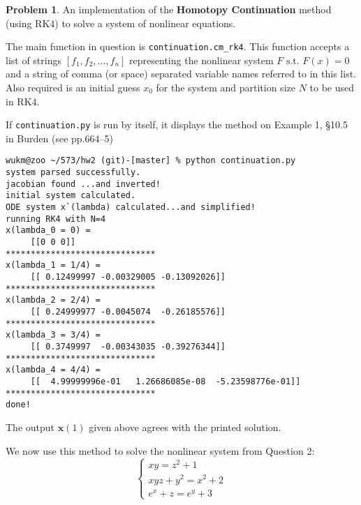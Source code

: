 \documentclass[10pt]{article}
\theoremstyle{plain}
\theoremstyle{definition}
\newtheorem{prob}{Problem}
\numberwithin{equation}{section}
\providecommand{\st}{\text{ s.t. }}
\begin{document}
\begin{prob}
    An implementation of the \textbf{Homotopy Continuation} method (using RK4) to solve a system of
    nonlinear equations.
    
    The main function in question is \texttt{continuation.cm\_rk4}. This function accepts
    a list of strings $[f_1, f_2, \ldots, f_n]$ representing the nonlinear system $F \st F(x)=0$
    and a string of comma (or space) separated variable names referred to in this list. 
    Also required is an initial guess $x_0$ for the system and partition size $N$ to be used in RK4.
    
    If \texttt{continuation.py} is run by itself, it displays the method on
    Example 1, \S10.5 in Burden (see pp.664--5)

\begin{small}
\begin{verbatim}
wukm@zoo ~/573/hw2 (git)-[master] % python continuation.py
system parsed successfully.
jacobian found ...and inverted! 
initial system calculated.
ODE system x`(lambda) calculated...and simplified!
running RK4 with N=4
x(lambda_0 = 0) =
	 [[0 0 0]]
******************************
x(lambda_1 = 1/4) = 
	 [[ 0.12499997 -0.00329005 -0.13092026]]
******************************
x(lambda_2 = 2/4) = 
	 [[ 0.24999977 -0.0045074  -0.26185576]]
******************************
x(lambda_3 = 3/4) = 
	 [[ 0.3749997  -0.00343035 -0.39276344]]
******************************
x(lambda_4 = 4/4) = 
	 [[  4.99999996e-01   1.26686085e-08  -5.23598776e-01]]
******************************
done!
\end{verbatim}  
\end{small}
The output $\bm{x}(1)$ given above agrees with the printed solution.

\hrulefill

We now use this method to solve the nonlinear system from Question 2:
\[ 
    \begin{cases}
        xy = z^2 + 1 \\
        xyz + y^2 = x^2 + 2 \\
        e^x + z = e^y + 3
    \end{cases}
\]


\end{prob}
\end{document}
